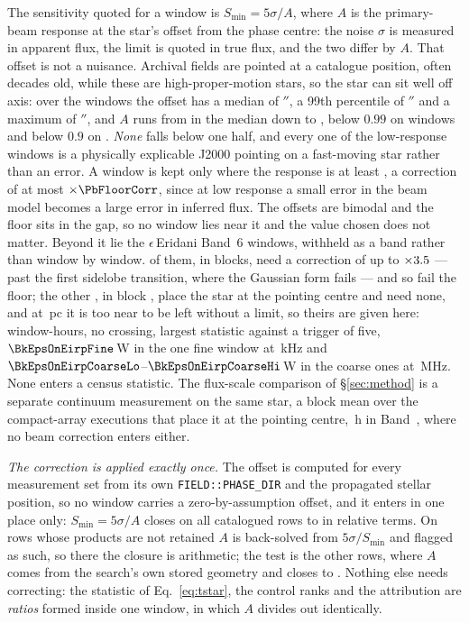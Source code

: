 The sensitivity quoted for a window is $S_{\min}=5\sigma/A$, where $A$ is the
primary-beam response at the star's offset from the phase centre: the noise
$\sigma$ is measured in apparent flux, the limit is quoted in true flux, and
the two differ by $A$. That offset is not a nuisance. Archival fields are
pointed at a catalogue position, often decades old, while these are
high-proper-motion stars, so the star can sit well off axis: over the
\PbNWin{} windows the offset has a median of \PbOffMed$''$, a 99th
percentile of \PbOffPNN$''$ and a maximum of \PbOffMax$''$, and $A$ runs from
\RpPbAMedApplied{} in the median down to \SensPbAMin, below $0.99$ on
\PbNLowNN{} windows and below $0.9$ on \RpPbNLowApplied. \emph{None} falls below
one half, and every one
of the low-response windows is a physically explicable J2000 pointing on a
fast-moving star rather than an error. A window is kept only where the
response is at least \PbFloorResp, a correction of at most
$\times\PbFloorCorr$, since at low response a small error in the beam model
becomes a large error in inferred flux. The offsets are bimodal and the floor
sits in the gap, so no window lies near it and the value chosen does not
matter.
Beyond it lie the \EpsEriNWin{} $\epsilon$\,Eridani Band~6 windows, withheld
as a band rather than window by window. \EpsEriNOffAxis{} of them, in
\LqEpsOffEb{} blocks, need a correction of up to $\times3.5$ ---
past the first sidelobe transition, where the Gaussian form fails --- and so
fail the floor; the other \EpsEriNOnAxis, in block \texttt{\BkEpsOnBlock},
place the star at the pointing centre and need none, and at \EpsEriDistPc\,pc
it is too near to be left without a limit, so theirs are given here:
\BkEpsOnHours\,window-hours, no crossing, largest statistic \BkEpsOnTMax{}
against a trigger of five, $\BkEpsOnEirpFine$\,W in the one fine window at
\BkEpsOnChanFineKHz\,kHz and $\BkEpsOnEirpCoarseLo$--$\BkEpsOnEirpCoarseHi$\,W
in the \BkEpsOnNCoarse{} coarse ones at \BkEpsOnChanCoarseMHz\,MHz. None
enters a census statistic. The flux-scale comparison of \S\ref{sec:method} is
a separate continuum measurement on the same star, a block mean over the
\PxEpsN{} compact-array executions that place it at the pointing centre,
\PxEpsHours\,h in Band~\PxEpsBand, where no beam correction enters either.

\emph{The correction is applied exactly once.} The offset is computed for
every measurement set from its own \texttt{FIELD::PHASE\_DIR} and the
propagated stellar position, so no window carries a zero-by-assumption
offset, and it enters in one place only: $S_{\min}=5\sigma/A$ closes on all
\PbSminClosed{} catalogued rows to \PbSminWorstRes{} in relative terms. On
\PbSminTaut{} rows whose products are not retained $A$ is back-solved from
$5\sigma/S_{\min}$ and flagged as such, so there the closure is arithmetic;
the test is the other \PbSminIndep{} rows, where $A$ comes from the search's
own stored geometry and closes to \PbSminIndepRes. Nothing else needs
correcting: the statistic of
Eq.~\ref{eq:tstar}, the control ranks and the attribution are \emph{ratios}
formed inside one window, in which $A$ divides out identically.

